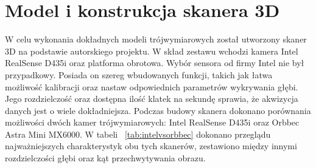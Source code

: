 \section{Model i konstrukcja skanera 3D}
W celu wykonania dokładnych modeli trójwymiarowych został utworzony skaner 3D na podstawie autorskiego projektu. W skład zestawu wchodzi kamera Intel RealSense D435i oraz platforma obrotowa. Wybór sensora od firmy Intel nie był przypadkowy. Posiada on szereg wbudowanych funkcji, takich jak łatwa możliwość kalibracji oraz nastaw odpowiednich parametrów wykrywania głębi. Jego rozdzielczość oraz dostępna ilość klatek na sekundę sprawia, że akwizycja danych jest o wiele dokładniejsza. Podczas budowy skanera dokonano porównania możliwości dwóch kamer trójwymiarowych: Intel RealSense D435i oraz Orbbec Astra Mini MX6000. W tabeli ~\ref{tab:intelvsorbbec} dokonano przeglądu najważniejszych charakterystyk obu tych skanerów, zestawiono między innymi rozdzielczości głębi oraz kąt przechwytywania obrazu.

